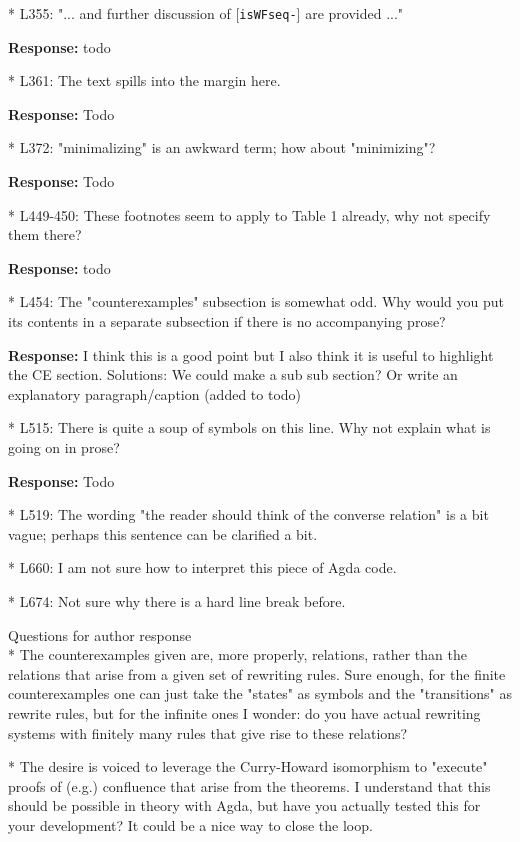 \documentclass[11pt]{article}
\newcommand{\res}[1]{\par\noindent\textbf{Response:} #1\par}
\begin{document}
* L355: "... and further discussion of [\texttt{isWFseq-}] are provided ..." \res{todo}

* L361: The text spills into the margin here. \res{Todo}

* L372: "minimalizing" is an awkward term; how about "minimizing"? \res{Todo}

* L449-450: These footnotes seem to apply to Table 1 already, why not specify
them there? \res{todo}

* L454: The "counterexamples" subsection is somewhat odd. Why would you put
its contents in a separate subsection if there is no accompanying prose? \res{I think this is a good point but I also think it is useful to highlight the CE section. Solutions: We could make a sub sub section? Or write an explanatory paragraph/caption (added to todo)}

* L515: There is quite a soup of symbols on this line. Why not explain what
is going on in prose? \res{Todo}

* L519: The wording "the reader should think of the converse relation" is a bit
vague; perhaps this sentence can be clarified a bit.

* L660: I am not sure how to interpret this piece of Agda code.

* L674: Not sure why there is a hard line break before.

Questions for author response
\\
* The counterexamples given are, more properly, relations, rather than the
relations that arise from a given set of rewriting rules. Sure enough, for
the finite counterexamples one can just take the "states" as symbols and the
"transitions" as rewrite rules, but for the infinite ones I wonder: do you
have actual rewriting systems with finitely many rules that give rise to
these relations?

* The desire is voiced to leverage the Curry-Howard isomorphism to "execute"
proofs of (e.g.) confluence that arise from the theorems. I understand that
this should be possible in theory with Agda, but have you actually tested
this for your development? It could be a nice way to close the loop.
\end{document}
